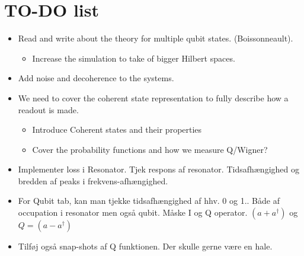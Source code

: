 \chapter*{TO-DO list }
\begin{itemize}
    \item Read and write about the theory for multiple qubit states. (Boissonneault).
    \begin{itemize}
        \item Increase the simulation to take of bigger Hilbert spaces.
    \end{itemize}
    \item Add noise and decoherence to the systems.
    \item We need to cover the coherent state representation to fully describe how a readout is made. 
    \begin{itemize}
        \item Introduce Coherent states and their properties
        \item Cover the probability functions and how we measure Q/Wigner? 
    \end{itemize}


\end{itemize}


\begin{itemize}
    \item Implementer loss i Resonator. Tjek respons af resonator. Tidsafhængighed og bredden af peaks i frekvens-afhængighed.
    \item For Qubit tab, kan man tjekke tidsafhængighed af hhv. 0 og 1.. Både af occupation i resonator men også qubit. Måske I og Q operator. $(a + a^\dagger)$ og $Q = (a - a^\dagger)$
    \item Tilføj også snap-shots af Q funktionen. Der skulle gerne være en hale. 
\end{itemize}
